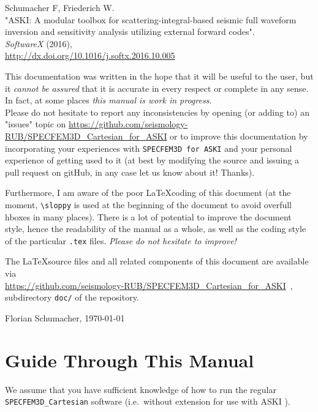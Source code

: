 \documentclass[12pt,a4paper]{article}
\newcommand{\lcode}[1]{\nolinkurl{#1}}
\newcommand{\ASKI}{ {\ttfamily ASKI} }
\begin{document}
Schumacher F, Friederich W.\\
"ASKI: A modular toolbox for scattering-integral-based seismic full waveform 
inversion and sensitivity analysis utilizing external forward codes".\\
\emph{SoftwareX} (2016),\\
\url{http://dx.doi.org/10.1016/j.softx.2016.10.005}

\vspace{1em}

This documentation was written in the hope that it will be useful to the user,
but it \emph{cannot be assured} that it is accurate in every respect or complete in any sense.
In fact, at some places \emph{this manual is work in progress}.\\
Please do not hesitate to report any inconsistencies by
opening (or adding to) an "issues" topic on \url{https://github.com/seismology-RUB/SPECFEM3D_Cartesian_for_ASKI}
or to improve this documentation by incorporating your experiences with \lcode{SPECFEM3D for ASKI} 
and your personal experience of getting used to it (at best by modifying the source and issuing a pull request
on gitHub, in any case let us know about it! Thanks).

Furthermore, I am aware of the poor \LaTeX coding of this document (at the moment, \verb+\sloppy+ is used
at the beginning of the document to avoid overfull hboxes in many places). There is a lot of potential
to improve the document 
style, hence the readability of the manual as a whole, as well as the coding style of the 
particular \lcode{.tex} files. \emph{Please do not hesitate to improve!}

The \LaTeX source files and all related components of this document are available via\\
\url{https://github.com/seismology-RUB/SPECFEM3D_Cartesian_for_ASKI}~, subdirectory 
\lcode{doc/} of the repository.
\begin{flushright}
Florian Schumacher, \mydate \today
\end{flushright}

\newpage
%
\section*{Guide Through This Manual}
%
We assume that you have sufficient knowledge of how to run the regular \lcode{SPECFEM3D_Cartesian} software
(i.e.\ without extension for use with \ASKI{}).
\end{document}
